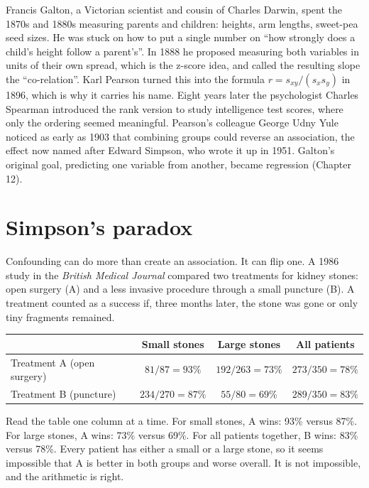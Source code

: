 \begin{historybox}
Francis Galton, a Victorian scientist and cousin of Charles Darwin, spent the 1870s
and 1880s measuring parents and children: heights, arm lengths, sweet-pea seed
sizes. He was stuck on how to put a single number on ``how strongly does a child's
height follow a parent's''. In 1888 he proposed measuring both variables in units
of their own spread, which is the z-score idea, and called the resulting slope the
``co-relation''. Karl Pearson turned this into the formula
$r = s_{xy}/(s_x s_y)$ in 1896, which is why it carries his name. Eight years later
the psychologist Charles Spearman introduced the rank version to study
intelligence test scores, where only the ordering seemed meaningful. Pearson's
colleague George Udny Yule noticed as early as 1903 that combining groups could
reverse an association, the effect now named after Edward Simpson, who wrote it up
in 1951. Galton's original goal, predicting one variable from another, became
regression (Chapter 12).
\end{historybox}

\section{Simpson's paradox}
\label{sec:corr-simpson}

Confounding can do more than create an association. It can flip one. A 1986 study
in the \emph{British Medical Journal} compared two treatments for kidney stones:
open surgery (A) and a less invasive procedure through a small puncture (B). A
treatment counted as a success if, three months later, the stone was gone or only
tiny fragments remained.

\begin{center}
\begin{tabular}{lccc}
\toprule
 & Small stones & Large stones & All patients \\
\midrule
Treatment A (open surgery) & $81/87 = 93\%$ & $192/263 = 73\%$ & $273/350 = 78\%$ \\
Treatment B (puncture) & $234/270 = 87\%$ & $55/80 = 69\%$ & $289/350 = 83\%$ \\
\bottomrule
\end{tabular}
\end{center}

Read the table one column at a time. For small stones, A wins: 93\% versus 87\%.
For large stones, A wins: 73\% versus 69\%. For all patients together, B wins:
83\% versus 78\%. Every patient has either a small or a large stone, so it seems
impossible that A is better in both groups and worse overall. It is not
impossible, and the arithmetic is right.

